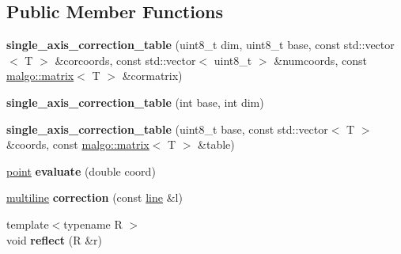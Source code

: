 \subsection*{Public Member Functions}
\begin{DoxyCompactItemize}
\item 
{\bfseries single\+\_\+axis\+\_\+correction\+\_\+table} (uint8\+\_\+t dim, uint8\+\_\+t base, const std\+::vector$<$ T $>$ \&corcoords, const std\+::vector$<$ uint8\+\_\+t $>$ \&numcoords, const \hyperlink{classmalgo_1_1matrix}{malgo\+::matrix}$<$ T $>$ \&cormatrix)\hypertarget{classgxx_1_1ngeom_1_1single__axis__correction__table_a299b90ccb62010958c2a6b017470e0c5}{}\label{classgxx_1_1ngeom_1_1single__axis__correction__table_a299b90ccb62010958c2a6b017470e0c5}

\item 
{\bfseries single\+\_\+axis\+\_\+correction\+\_\+table} (int base, int dim)\hypertarget{classgxx_1_1ngeom_1_1single__axis__correction__table_ad856aa01247b02c288a7e3cf661442ba}{}\label{classgxx_1_1ngeom_1_1single__axis__correction__table_ad856aa01247b02c288a7e3cf661442ba}

\item 
{\bfseries single\+\_\+axis\+\_\+correction\+\_\+table} (uint8\+\_\+t base, const std\+::vector$<$ T $>$ \&coords, const \hyperlink{classmalgo_1_1matrix}{malgo\+::matrix}$<$ T $>$ \&table)\hypertarget{classgxx_1_1ngeom_1_1single__axis__correction__table_a74714b7d59fc72a38137c194375ce4ce}{}\label{classgxx_1_1ngeom_1_1single__axis__correction__table_a74714b7d59fc72a38137c194375ce4ce}

\item 
\hyperlink{classgxx_1_1ngeom_1_1point}{point} {\bfseries evaluate} (double coord)\hypertarget{classgxx_1_1ngeom_1_1single__axis__correction__table_aae270099341f58bdc0f05c1ce3ddb240}{}\label{classgxx_1_1ngeom_1_1single__axis__correction__table_aae270099341f58bdc0f05c1ce3ddb240}

\item 
\hyperlink{classgxx_1_1ngeom_1_1multiline}{multiline} {\bfseries correction} (const \hyperlink{classgxx_1_1ngeom_1_1line}{line} \&l)\hypertarget{classgxx_1_1ngeom_1_1single__axis__correction__table_a494982eaa3f458acd836ab1b59e7bd43}{}\label{classgxx_1_1ngeom_1_1single__axis__correction__table_a494982eaa3f458acd836ab1b59e7bd43}

\item 
{\footnotesize template$<$typename R $>$ }\\void {\bfseries reflect} (R \&r)\hypertarget{classgxx_1_1ngeom_1_1single__axis__correction__table_a1ba35ce1f4fd1e586bd1cbba430fe054}{}\label{classgxx_1_1ngeom_1_1single__axis__correction__table_a1ba35ce1f4fd1e586bd1cbba430fe054}

\end{DoxyCompactItemize}
